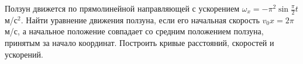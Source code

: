 Ползун движется по прямолинейной направляющей с ускорением
$\omega_x=-\pi^2 \sin \frac{\pi}{2} t$ м/с$^2$. Найти уравнение движения
ползуна, если его начальная скорость $v_0x=2\pi$ м/с, а начальное
положение совпадает со средним положением ползуна, принятым за начало
координат. Построить кривые расстояний, скоростей и ускорений.
